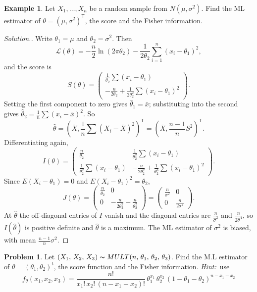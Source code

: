 \documentclass[12pt,a4paper]{report}
\theoremstyle{definition}
\newtheorem{exa}[thm]{Example}
\newtheorem{problemx}{Problem}[section]
\newenvironment{problem}{\begin{problemx}}{\end{problemx}}
\newenvironment{solution}
  {\renewcommand{\qedsymbol}{}\begin{proof}[\textit{Solution}.]}
  {\end{proof}}
\begin{document}
\begin{exa}
\label{ex:normalmle}
Let $X_1, \dots, X_n$ be a random sample from $N(\mu, \sigma^2)$. Find the ML
estimator of $\theta = (\mu, \sigma^2)^{\mathsf T}$, the score and the Fisher
information.
\end{exa}

\begin{solution}
Write $\theta_1 = \mu$ and $\theta_2 = \sigma^2$. Then
\[\mathcal{L}(\theta) = -\frac n2\ln(2\pi\theta_2) - \frac{1}{2\theta_2}\sum^n_{i = 1}(x_i - \theta_1)^2,\]
and the score is
\[S(\theta) = \begin{pmatrix}
\frac{1}{\theta_2}\sum(x_i - \theta_1)\\[1ex]
-\frac{n}{2\theta_2} + \frac{1}{2\theta_2^2}\sum(x_i - \theta_1)^2
\end{pmatrix}.\]
Setting the first component to zero gives $\hat\theta_1 = \bar x$; substituting into
the second gives $\hat\theta_2 = \frac1n\sum(x_i - \bar x)^2$. So
\[\hat\theta = \left(\bar X, \frac1n\sum(X_i - \bar X)^2\right)^{\mathsf T} = \left(\bar X, \frac{n - 1}{n}S^2\right)^{\mathsf T} .\]
Differentiating again,
\[I(\theta) = \begin{pmatrix}
\frac{n}{\theta_2} & \frac{1}{\theta_2^2}\sum(x_i - \theta_1)\\[1ex]
\frac{1}{\theta_2^2}\sum(x_i - \theta_1) & -\frac{n}{2\theta_2^2} + \frac{1}{\theta_2^3}\sum(x_i - \theta_1)^2
\end{pmatrix}.\]
Since $E(X_i - \theta_1) = 0$ and $E(X_i - \theta_1)^2 = \theta_2$,
\[J(\theta) = \begin{pmatrix}
\frac{n}{\theta_2} & 0\\[1ex]
0 & -\frac{n}{2\theta_2^2} + \frac{n}{\theta_2^2}
\end{pmatrix}
= \begin{pmatrix}
\frac{n}{\sigma^2} & 0\\[1ex]
0 & \frac{n}{2\sigma^4}
\end{pmatrix}.\]
At $\hat\theta$ the off-diagonal entries of $I$ vanish and the diagonal entries are
$\frac{n}{\hat\sigma^2}$ and $\frac{n}{2\hat\sigma^4}$, so $I(\hat\theta)$ is positive
definite and $\hat\theta$ is a maximum. The ML estimator of $\sigma^2$ is biased,
with mean $\frac{n - 1}{n}\sigma^2$.
\end{solution}

\begin{problem}
\label{prob:multinomialmle}
Let $(X_1, \, X_2, \, X_3) \thicksim MULT(n, \, \theta_1, \, \theta_2, \, \theta_3)$. Find the M.L estimator of $\theta = (\theta_1, \theta_2)^t$, the score function and the Fisher information.
\textit{Hint:}\, use 
\[f_{\theta}(x_1, x_2, x_3)  = \frac{n!}{x_1!\, x_2!\, (n - x_1 - x_2)!}\, \theta_1^{x_1}\, \theta_2^{x_2}\, \left(1 - \theta_1 - \theta_2\right)^{n - x_1 - x_2}\]
\end{problem}
\end{document}
